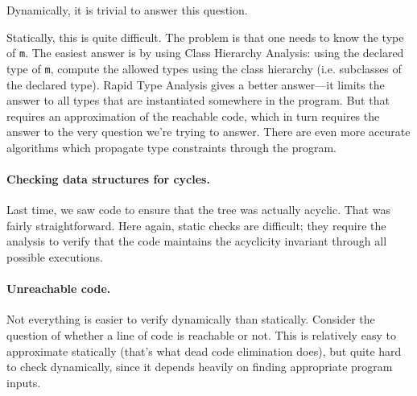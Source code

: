 \documentclass[11pt]{article}
\begin{document}
Dynamically, it is trivial to answer this question.

Statically, this is quite difficult. The problem is that one needs to
know the type of {\tt m}.  The easiest answer is by using Class
Hierarchy Analysis: using the declared type of {\tt m}, compute the
allowed types using the class hierarchy (i.e. subclasses of the
declared type).  Rapid Type Analysis gives a better answer---it limits
the answer to all types that are instantiated somewhere in the
program. But that requires an approximation of the reachable code,
which in turn requires the answer to the very question we're trying to
answer.  There are even more accurate algorithms which propagate type
constraints through the program.

\paragraph{Checking data structures for cycles.} Last time, we saw code
to ensure that the tree was actually acyclic. That was fairly straightforward.
Here again, static checks are difficult; they require the analysis to verify that
the code maintains the acyclicity invariant through all possible executions.

\paragraph{Unreachable code.} Not everything is easier to verify dynamically
than statically. Consider the question of whether a line of code is reachable
or not. This is relatively easy to approximate statically (that's what dead
code elimination does), but quite hard to check dynamically, since it depends
heavily on finding appropriate program inputs.
\end{document}

